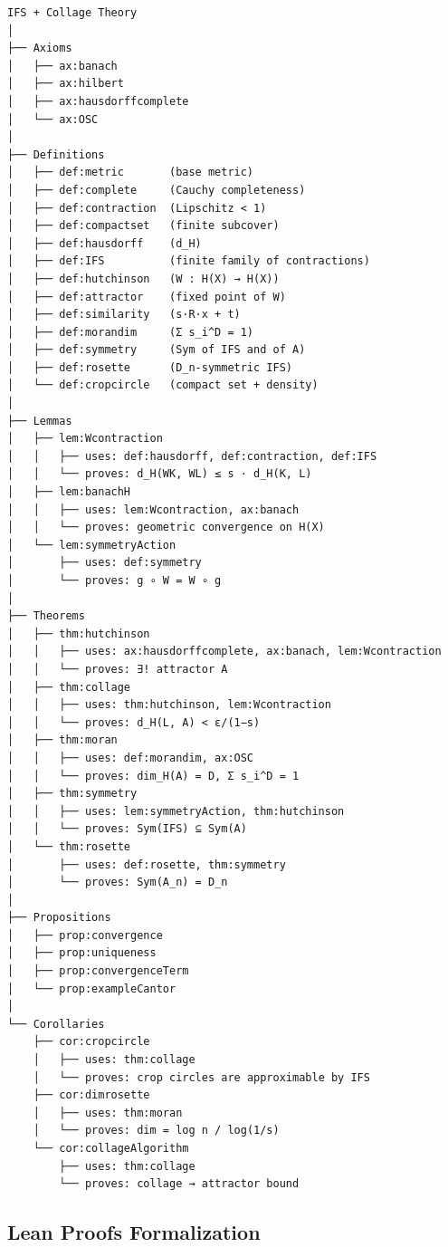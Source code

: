 \documentclass[10pt]{amsart}
\theoremstyle{break}
\begin{document}
\begin{verbatim}
IFS + Collage Theory
│
├── Axioms
│   ├── ax:banach
│   ├── ax:hilbert
│   ├── ax:hausdorffcomplete
│   └── ax:OSC
│
├── Definitions
│   ├── def:metric       (base metric)
│   ├── def:complete     (Cauchy completeness)
│   ├── def:contraction  (Lipschitz < 1)
│   ├── def:compactset   (finite subcover)
│   ├── def:hausdorff    (d_H)
│   ├── def:IFS          (finite family of contractions)
│   ├── def:hutchinson   (W : H(X) → H(X))
│   ├── def:attractor    (fixed point of W)
│   ├── def:similarity   (s·R·x + t)
│   ├── def:morandim     (Σ s_i^D = 1)
│   ├── def:symmetry     (Sym of IFS and of A)
│   ├── def:rosette      (D_n-symmetric IFS)
│   └── def:cropcircle   (compact set + density)
│
├── Lemmas
│   ├── lem:Wcontraction
│   │   ├── uses: def:hausdorff, def:contraction, def:IFS
│   │   └── proves: d_H(WK, WL) ≤ s · d_H(K, L)
│   ├── lem:banachH
│   │   ├── uses: lem:Wcontraction, ax:banach
│   │   └── proves: geometric convergence on H(X)
│   └── lem:symmetryAction
│       ├── uses: def:symmetry
│       └── proves: g ∘ W = W ∘ g
│
├── Theorems
│   ├── thm:hutchinson
│   │   ├── uses: ax:hausdorffcomplete, ax:banach, lem:Wcontraction
│   │   └── proves: ∃! attractor A
│   ├── thm:collage
│   │   ├── uses: thm:hutchinson, lem:Wcontraction
│   │   └── proves: d_H(L, A) < ε/(1−s)
│   ├── thm:moran
│   │   ├── uses: def:morandim, ax:OSC
│   │   └── proves: dim_H(A) = D, Σ s_i^D = 1
│   ├── thm:symmetry
│   │   ├── uses: lem:symmetryAction, thm:hutchinson
│   │   └── proves: Sym(IFS) ⊆ Sym(A)
│   └── thm:rosette
│       ├── uses: def:rosette, thm:symmetry
│       └── proves: Sym(A_n) = D_n
│
├── Propositions
│   ├── prop:convergence
│   ├── prop:uniqueness
│   ├── prop:convergenceTerm
│   └── prop:exampleCantor
│
└── Corollaries
    ├── cor:cropcircle
    │   ├── uses: thm:collage
    │   └── proves: crop circles are approximable by IFS
    ├── cor:dimrosette
    │   ├── uses: thm:moran
    │   └── proves: dim = log n / log(1/s)
    └── cor:collageAlgorithm
        ├── uses: thm:collage
        └── proves: collage → attractor bound
\end{verbatim}

\subsection{Lean Proofs Formalization}
\end{document}
